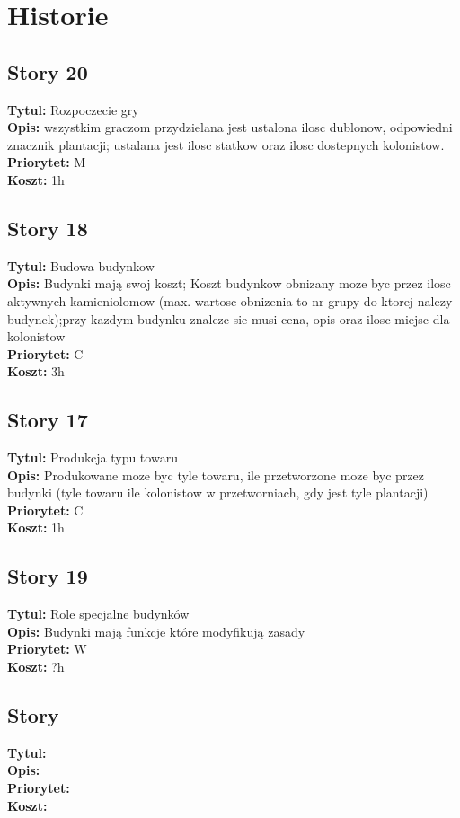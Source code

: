 \documentclass[12pt]{article}
\begin{document}
\section{Historie}

\subsection{Story 20}
\textbf{Tytul:} Rozpoczecie gry \\
\textbf{Opis:} wszystkim graczom przydzielana jest ustalona ilosc dublonow, odpowiedni
znacznik plantacji; ustalana jest ilosc statkow oraz ilosc dostepnych
kolonistow. \\
\textbf{Priorytet:} M \\
\textbf{Koszt:} 1h \\

\subsection{Story 18 }
\textbf{Tytul:} Budowa budynkow \\
\textbf{Opis:}  Budynki mają swoj koszt; Koszt budynkow obnizany moze byc przez
ilosc aktywnych kamieniolomow (max. wartosc obnizenia to nr grupy do ktorej
nalezy budynek);przy kazdym budynku znalezc sie musi cena, opis oraz ilosc
miejsc dla kolonistow\\
\textbf{Priorytet:} C \\
\textbf{Koszt:} 3h \\

\subsection{Story 17}
\textbf{Tytul:} Produkcja typu towaru \\
\textbf{Opis:} Produkowane moze byc tyle towaru, ile przetworzone moze byc przez
budynki (tyle towaru ile kolonistow w przetworniach, gdy jest tyle plantacji)\\
\textbf{Priorytet:} C \\
\textbf{Koszt:} 1h \\


\subsection{Story 19}
\textbf{Tytul:} Role specjalne budynków \\
\textbf{Opis:} Budynki mają funkcje które modyfikują zasady \\
\textbf{Priorytet:} W \\
\textbf{Koszt:} ?h \\

\subsection{Story }
\textbf{Tytul:}  \\
\textbf{Opis:}  \\
\textbf{Priorytet:}  \\
\textbf{Koszt:}  \\
\end{document}
